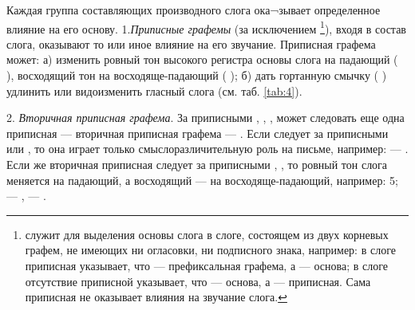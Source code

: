 Каждая группа составляющих производного слога ока¬зывает определенное влияние на его основу.
1.\emph{Приписные графемы} (за исключением \footnote[11]{ служит для выделения основы слога в слоге, состоящем из двух корневых графем, не имеющих ни огласовки, ни подписного знака, например: в слоге  приписная  указывает, что  --- префиксальная графема, а  --- основа; в слоге  отсутствие приписной  указывает, что  --- основа, а  --- приписная. Сама приписная не оказывает влияния на звучание слога.}), входя в состав слога, оказывают то или иное влияние на его звучание. Приписная графема может: а) изменить ровный тон высокого регистра основы слога на падающий
(  \toneN ), восходящий тон на восходяще-падающий (  \toneVN ); б) дать гортанную смычку ( \toneG ) удлинить или видоизменить гласный слога (см. таб. \ref{tab:4}).

2. \emph{Вторичная приписная графема}. За приписными , , ,  может следовать еще одна приписная --- вторичная приписная графема --- . Если  следует за приписными  или , то она играет только смыслоразличительную роль на письме, например:  --- . Если же вторичная приписная следует за приписными , , то ровный тон слога меняется на падающий, а восходящий --- на восходяще-падающий, например:  5;  ---  , --- .

